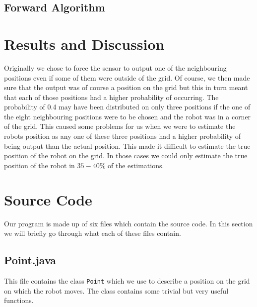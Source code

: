 \documentclass[a4paper]{article}
\begin{document}
\subsection{Forward Algorithm}
\label{for_alg}


\section{Results and Discussion}
Originally we chose to force the sensor to output one of the neighbouring positions even if some of them were outside of the grid. Of course, we then made sure that the output was of course a position on the grid but this in turn meant that each of those positions had a higher probability of occurring. The probability of 0.4 may have been distributed on only three positions if the one of the eight neighbouring positions were to be chosen and the robot was in a corner of the grid. This caused some problems for us when we were to estimate the robots position as any one of these three positions had a higher probability of being output than the actual position. This made it difficult to estimate the true position of the robot on the grid. In those cases we could only estimate the true position of the robot in $35 - 40\%$ of the estimations.

\section{Source Code}
Our program is made up of six files which contain the source code. In this section we will briefly go through what each of these files contain.

\subsection{Point.java}
This file contains the class \texttt{Point} which we use to describe a position on the grid on which the robot moves. The class contains some trivial but very useful functions.
\end{document}
